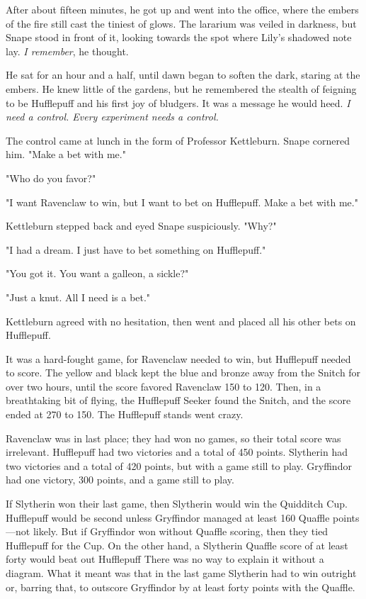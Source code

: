 After about fifteen minutes, he got up and went into the office, where the embers of the fire still cast the tiniest of glows. The lararium was veiled in darkness, but Snape stood in front of it, looking towards the spot where Lily's shadowed note lay. \emph{I remember}, he thought.

He sat for an hour and a half, until dawn began to soften the dark, staring at the embers. He knew little of the gardens, but he remembered the stealth of feigning to be Hufflepuff and his first joy of bludgers. It was a message he would heed. \emph{I need a control. Every experiment needs a control.}

The control came at lunch in the form of Professor Kettleburn. Snape cornered him. "Make a bet with me."

"Who do you favor?"

"I want Ravenclaw to win, but I want to bet on Hufflepuff. Make a bet with me."

Kettleburn stepped back and eyed Snape suspiciously. "Why?"

"I had a dream. I just have to bet something on Hufflepuff."

"You got it. You want a galleon, a sickle?"

"Just a knut. All I need is a bet."

Kettleburn agreed with no hesitation, then went and placed all his other bets on Hufflepuff.

It was a hard-fought game, for Ravenclaw needed to win, but Hufflepuff needed to score. The yellow and black kept the blue and bronze away from the Snitch for over two hours, until the score favored Ravenclaw 150 to 120. Then, in a breathtaking bit of flying, the Hufflepuff Seeker found the Snitch, and the score ended at 270 to 150. The Hufflepuff stands went crazy.

Ravenclaw was in last place; they had won no games, so their total score was irrelevant. Hufflepuff had two victories and a total of 450 points. Slytherin had two victories and a total of 420 points, but with a game still to play. Gryffindor had one victory, 300 points, and a game still to play.

If Slytherin won their last game, then Slytherin would win the Quidditch Cup. Hufflepuff would be second unless Gryffindor managed at least 160 Quaffle points—not likely. But if Gryffindor won without Quaffle scoring, then they tied Hufflepuff for the Cup. On the other hand, a Slytherin Quaffle score of at least forty would beat out Hufflepuff{\el} There was no way to explain it without a diagram. What it meant was that in the last game Slytherin had to win outright or, barring that, to outscore Gryffindor by at least forty points with the Quaffle.

